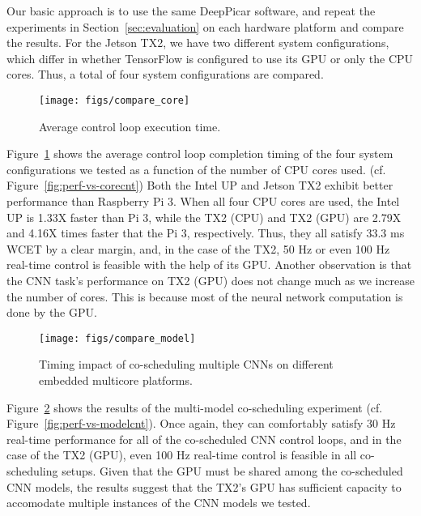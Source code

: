 Our basic approach is to use the same DeepPicar software, and repeat
the experiments in Section~\ref{sec:evaluation} on each hardware
platform and compare the results. 
For the Jetson TX2, we have two different system configurations,
which differ in whether TensorFlow is configured to use its GPU or
only the CPU cores. Thus, a total of four system configurations are
compared.

\begin{figure}[h]
  \centering
  \texttt{[image: figs/compare\_core]}
  \caption{Average control loop execution time.} 
  \label{fig:sys_core}
\end{figure}

Figure~\ref{fig:sys_core} shows the average control loop completion
timing of the four system configurations we tested as a function of
the number of CPU cores used. (cf. Figure~\ref{fig:perf-vs-corecnt})
Both the Intel UP and Jetson TX2 exhibit better performance than
Raspberry Pi 3. When all four CPU cores are used, the Intel UP is
1.33X faster than Pi 3, while the TX2 (CPU) and TX2 (GPU) are 2.79X and
4.16X times faster that the Pi 3, respectively.
Thus, they all satisfy 33.3 ms WCET by a clear margin, and, in the
case of the TX2, 50 Hz or even 100 Hz real-time control is feasible
with the help of its GPU.
Another observation is that the CNN task's performance on TX2 (GPU)
does not change much as we increase the number of cores. This
is because most of the neural network computation is done by the GPU.

\begin{figure}[h]
  \centering
  \texttt{[image: figs/compare\_model]}
  \caption{Timing impact of co-scheduling multiple CNNs on different
    embedded multicore platforms. %
  }
  \label{fig:sys_model}
\end{figure}

Figure~\ref{fig:sys_model} shows the results of the
multi-model co-scheduling experiment
(cf. Figure~\ref{fig:perf-vs-modelcnt}). Once again, they can comfortably
satisfy 30 Hz real-time performance for all of the co-scheduled CNN control
loops, and in the case of the TX2 (GPU), even 100 Hz real-time control
is feasible in all co-scheduling setups.
Given that the GPU must be shared among the co-scheduled CNN
models, the results suggest that the TX2's GPU has sufficient capacity to
accomodate multiple instances of the CNN models we tested.

